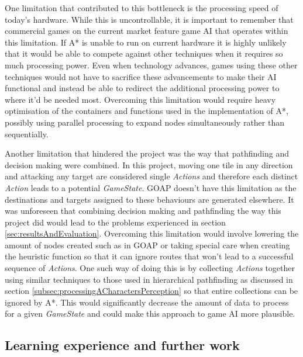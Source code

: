 \documentclass[11pt, a4paper]{report}
\begin{document}
One limitation that contributed to this bottleneck is the processing speed of today's hardware. While this is uncontrollable, it is important to remember that commercial games on the current market feature game AI that operates within this limitation. If A* is unable to run on current hardware it is highly unlikely that it would be able to compete against other techniques when it requires so much processing power. Even when technology advances, games using these other techniques would not have to sacrifice these advancements to make their AI functional and instead be able to redirect the additional processing power to where it'd be needed most. Overcoming this limitation would require heavy optimisation of the containers and functions used in the implementation of A*, possibly using parallel processing to expand nodes simultaneously rather than sequentially.

Another limitation that hindered the project was the way that pathfinding and decision making were combined. In this project, moving one tile in any direction and attacking any target are considered single \emph{Actions} and therefore each distinct \emph{Action} leads to a potential \emph{GameState}. GOAP doesn't have this limitation as the destinations and targets assigned to these behaviours are generated elsewhere. It was unforeseen that combining decision making and pathfinding the way this project did would lead to the problems experienced in section \ref{sec:resultsAndEvaluation}. Overcoming this limitation would involve lowering the amount of nodes created such as in GOAP or taking special care when creating the heuristic function so that it can ignore routes that won't lead to a successful sequence of \emph{Actions}. One such way of doing this is by collecting \emph{Actions} together using similar techniques to those used in hierarchical pathfinding as discussed in section \ref{subsec:processingACharactersPerception} so that entire collections can be ignored by A*. This would significantly decrease the amount of data to process for a given \emph{GameState} and could make this approach to game AI more plausible. 

\subsection{Learning experience and further work}
\label{subsec:learningExperienceAndFurtherWork}
\end{document}
